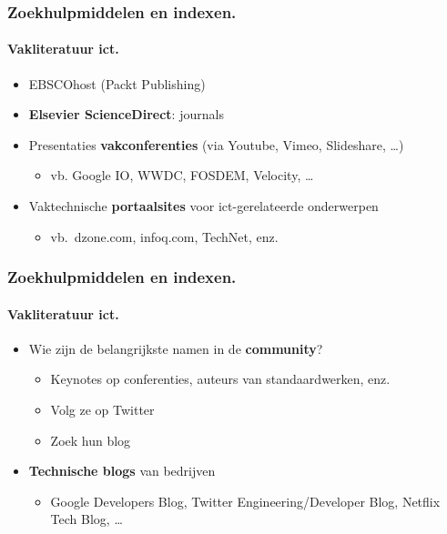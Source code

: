 \documentclass[aspectratio=169]{beamer}
\begin{document}
\begin{frame}
  \frametitle{Zoekhulpmiddelen en indexen.}
  \framesubtitle{Vakliteratuur ict.}

  \begin{itemize}
    \item EBSCOhost (Packt Publishing)
    \item<+-> \textbf{Elsevier ScienceDirect}: journals
    \item<+-> Presentaties \textbf{vakconferenties} (via Youtube, Vimeo, Slideshare, \dots)
          \begin{itemize}
            \item vb. Google IO, WWDC, FOSDEM, Velocity, \dots
          \end{itemize}
    \item<+-> Vaktechnische \textbf{portaalsites} voor ict-gerelateerde onderwerpen
      \begin{itemize}
        \item vb.~dzone.com, infoq.com, TechNet, enz.
      \end{itemize}
  \end{itemize}
\end{frame}

\begin{frame}
  \frametitle{Zoekhulpmiddelen en indexen.}
  \framesubtitle{Vakliteratuur ict.}

  \begin{itemize}
    \item<+-> Wie zijn de belangrijkste namen in de \textbf{community}?
      \begin{itemize}
        \item Keynotes op conferenties, auteurs van standaardwerken, enz.
        \item Volg ze op Twitter
        \item Zoek hun blog
      \end{itemize}
    \item<+-> \textbf{Technische blogs} van bedrijven
      \begin{itemize}
        \item Google Developers Blog, Twitter Engineering/Developer Blog, Netflix Tech Blog, \dots
      \end{itemize}
  \end{itemize}
\end{frame}
\end{document}
